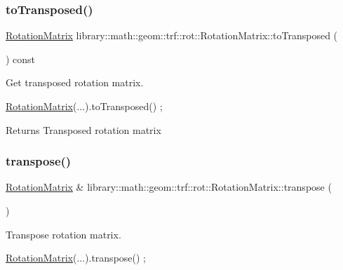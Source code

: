 \subsubsection{\texorpdfstring{to\+Transposed()}{toTransposed()}}
{\footnotesize\ttfamily \hyperlink{classlibrary_1_1math_1_1geom_1_1trf_1_1rot_1_1_rotation_matrix}{Rotation\+Matrix} library\+::math\+::geom\+::trf\+::rot\+::\+Rotation\+Matrix\+::to\+Transposed (\begin{DoxyParamCaption}{ }\end{DoxyParamCaption}) const}



Get transposed rotation matrix. 


\begin{DoxyCode}
\hyperlink{classlibrary_1_1math_1_1geom_1_1trf_1_1rot_1_1_rotation_matrix_a667d2c05aa5b0cc88775938d11164cdc}{RotationMatrix}(...).toTransposed() ;
\end{DoxyCode}


\begin{DoxyReturn}{Returns}
Transposed rotation matrix 
\end{DoxyReturn}
\mbox{\label{classlibrary_1_1math_1_1geom_1_1trf_1_1rot_1_1_rotation_matrix_ad289d307f62b26ab7e1340698388789a}} 
\subsubsection{\texorpdfstring{transpose()}{transpose()}}
{\footnotesize\ttfamily \hyperlink{classlibrary_1_1math_1_1geom_1_1trf_1_1rot_1_1_rotation_matrix}{Rotation\+Matrix} \& library\+::math\+::geom\+::trf\+::rot\+::\+Rotation\+Matrix\+::transpose (\begin{DoxyParamCaption}{ }\end{DoxyParamCaption})}



Transpose rotation matrix. 


\begin{DoxyCode}
\hyperlink{classlibrary_1_1math_1_1geom_1_1trf_1_1rot_1_1_rotation_matrix_a667d2c05aa5b0cc88775938d11164cdc}{RotationMatrix}(...).transpose() ;
\end{DoxyCode}
 \mbox{\label{classlibrary_1_1math_1_1geom_1_1trf_1_1rot_1_1_rotation_matrix_a0d1a95670bf9a5ae6bb2ac1bdee0294f}} 

